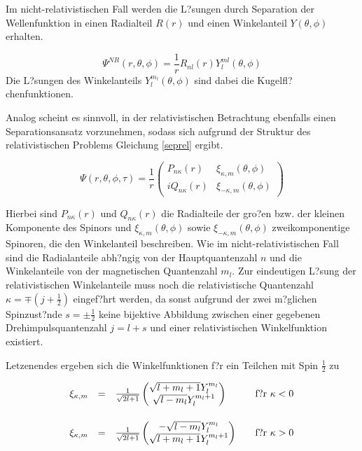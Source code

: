 Im nicht-relativistischen Fall werden die L?sungen durch Separation der Wellenfunktion in einen Radialteil $R(r)$ und einen Winkelanteil $Y(\theta,\phi)$ erhalten.

\begin{equation}
\Psi^{NR}(r,\theta,\phi) = \frac1r R_{nl}(r)Y^{ml}_l(\theta,\phi)
\end{equation}
Die L?sungen des Winkelanteils $Y_l^{m_l}(\theta,\phi)$ sind dabei die Kugelfl?chenfunktionen.

Analog scheint es sinnvoll, in der relativistischen Betrachtung ebenfalls einen Separationsansatz vorzunehmen, sodass sich aufgrund der Struktur des relativistischen Problems Gleichung \ref{seprel} ergibt.

\begin{equation}\label{seprel}
\Psi(r,\theta,\phi,\tau) = \frac1r \left( \begin{array}{rl}
P_{n\kappa}(r)  & \xi_{\kappa,m}(\theta,\phi)\\
iQ_{n\kappa}(r) & \xi_{-\kappa,m}(\theta,\phi)
\end{array}\right)
\end{equation}

Hierbei sind  $P_{n\kappa}(r)$ und $Q_{n\kappa}(r)$ die Radialteile der gro?en bzw. der kleinen Komponente des Spinors und $\xi_{\kappa,m}(\theta,\phi)$ sowie $\xi_{-\kappa,m}(\theta,\phi)$ zweikomponentige Spinoren, die den Winkelanteil beschreiben. Wie im nicht-relativistischen Fall sind die Radialanteile abh?ngig von der Hauptquantenzahl $n$ und die Winkelanteile von der magnetischen Quantenzahl $m_l$. Zur eindeutigen L?sung der relativistischen Winkelanteile muss noch die relativistische Quantenzahl $\kappa=\mp(j+\frac12)$ eingef?hrt werden, da sonst aufgrund der zwei m?glichen Spinzust?nde $s=\pm \frac12$ keine bijektive Abbildung zwischen einer gegebenen Drehimpulsquantenzahl $j=l+s$ und einer relativistischen Winkelfunktion existiert.

Letzenendes ergeben sich die Winkelfunktionen f?r ein Teilchen mit Spin $\frac12$ zu

\begin{equation}\begin{array}{rcll}
\xi_{\kappa,m} &=& \frac1{\sqrt{2l+1}}\begin{pmatrix}\sqrt{l+m_l+1}Y_l^{m_l}\\\sqrt{l-m_l}Y_l^{m_l+1}\end{pmatrix} &\quad\text{f?r }\kappa<0\\\vphantom{\rule{0pt}{30pt}}
\xi_{\kappa,m} &=& \frac1{\sqrt{2l+1}}\begin{pmatrix}-\sqrt{l-m_l}Y_l^{m_l}\\\sqrt{l+m_l+1}Y_l^{m_l+1}\end{pmatrix} &\quad\text{f?r }\kappa>0\\
\end{array}\end{equation}

